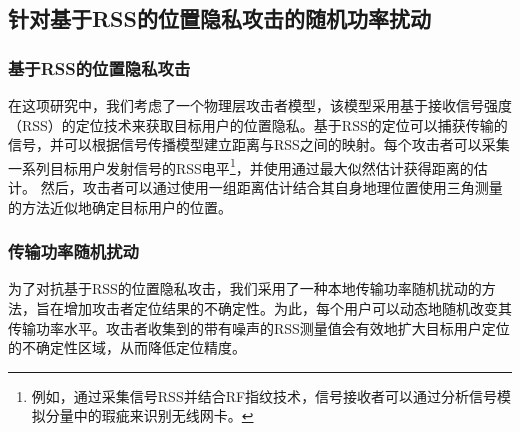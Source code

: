 \subsection{针对基于RSS的位置隐私攻击的随机功率扰动}\label{sec:privacy-model}
\subsubsection{基于RSS的位置隐私攻击}
在这项研究中，我们考虑了一个物理层攻击者模型，该模型采用基于接收信号强度（RSS）的定位技术来获取目标用户的位置隐私。基于RSS的定位可以捕获传输的信号，并可以根据信号传播模型\cite{Jiang07,EI10}建立距离与RSS之间的映射。每个攻击者可以采集一系列目标用户发射信号的RSS电平\footnote{例如，通过采集信号RSS并结合RF指纹技术\cite{TIEYuanchao}，信号接收者可以通过分析信号模拟分量中的瑕疵来识别无线网卡。}，并使用通过最大似然估计\cite{RSSguang}获得距离的估计。
然后，攻击者可以通过使用一组距离估计结合其自身地理位置使用三角测量的方法近似地确定目标用户的位置。


\subsubsection{传输功率随机扰动}
为了对抗基于RSS的位置隐私攻击，我们采用了一种本地传输功率随机扰动的方法，旨在增加攻击者定位结果的不确定性\cite{EI10}。为此，每个用户可以动态地随机改变其传输功率水平。攻击者收集到的带有噪声的RSS测量值会有效地扩大目标用户定位的不确定性区域，从而降低定位精度。

